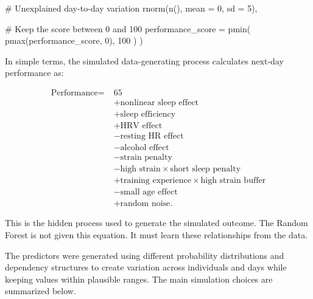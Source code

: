 \documentclass[
  letterpaper,
  DIV=11,
  numbers=noendperiod]{scrreprt}
\newenvironment{Shaded}{\begin{snugshade}}{\end{snugshade}}
\newcommand{\AttributeTok}[1]{\textcolor[rgb]{0.40,0.45,0.13}{#1}}
\newcommand{\CommentTok}[1]{\textcolor[rgb]{0.37,0.37,0.37}{#1}}
\newcommand{\DecValTok}[1]{\textcolor[rgb]{0.68,0.00,0.00}{#1}}
\newcommand{\FunctionTok}[1]{\textcolor[rgb]{0.28,0.35,0.67}{#1}}
\newcommand{\NormalTok}[1]{\textcolor[rgb]{0.00,0.23,0.31}{#1}}
\begin{document}
\begin{Shaded}
\begin{Highlighting}[]
      \CommentTok{\# Unexplained day{-}to{-}day variation}
      \FunctionTok{rnorm}\NormalTok{(}\FunctionTok{n}\NormalTok{(), }\AttributeTok{mean =} \DecValTok{0}\NormalTok{, }\AttributeTok{sd =} \DecValTok{5}\NormalTok{),}

    \CommentTok{\# Keep the score between 0 and 100}
    \AttributeTok{performance\_score =} \FunctionTok{pmin}\NormalTok{(}
      \FunctionTok{pmax}\NormalTok{(performance\_score, }\DecValTok{0}\NormalTok{),}
      \DecValTok{100}
\NormalTok{    )}
\NormalTok{  )}
\end{Highlighting}
\end{Shaded}

In simple terms, the simulated data-generating process calculates
next-day performance as:

\[
\begin{aligned}
\text{Performance} =\;& 65 \\
&+ \text{nonlinear sleep effect} \\
&+ \text{sleep efficiency} \\
&+ \text{HRV effect} \\
&- \text{resting HR effect} \\
&- \text{alcohol effect} \\
&- \text{strain penalty} \\
&- \text{high strain} \times \text{short sleep penalty} \\
&+ \text{training experience} \times \text{high strain buffer} \\
&- \text{small age effect} \\
&+ \text{random noise}.
\end{aligned}
\]

This is the hidden process used to generate the simulated outcome. The
Random Forest is not given this equation. It must learn these
relationships from the data.

The predictors were generated using different probability distributions
and dependency structures to create variation across individuals and
days while keeping values within plausible ranges. The main simulation
choices are summarized below.
\end{document}
